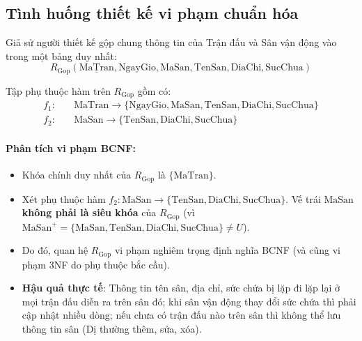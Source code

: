 \subsection{Tình huống thiết kế vi phạm chuẩn hóa}
Giả sử người thiết kế gộp chung thông tin của Trận đấu và Sân vận động vào trong một bảng duy nhất:
$$R_{\text{Gop}}(\underline{\text{MaTran}}, \text{NgayGio}, \text{MaSan}, \text{TenSan}, \text{DiaChi}, \text{SucChua})$$

Tập phụ thuộc hàm trên $R_{\text{Gop}}$ gồm có:
\begin{align*}
    f_1: & \quad \text{MaTran} \rightarrow \{\text{NgayGio}, \text{MaSan}, \text{TenSan}, \text{DiaChi}, \text{SucChua}\} \\
    f_2: & \quad \text{MaSan} \rightarrow \{\text{TenSan}, \text{DiaChi}, \text{SucChua}\}
\end{align*}

\paragraph{Phân tích vi phạm BCNF:}
\begin{itemize}
    \item Khóa chính duy nhất của $R_{\text{Gop}}$ là $\{\text{MaTran}\}$.
    \item Xét phụ thuộc hàm $f_2: \text{MaSan} \rightarrow \{\text{TenSan}, \text{DiaChi}, \text{SucChua}\}$. Vế trái $\text{MaSan}$ \textbf{không phải là siêu khóa} của $R_{\text{Gop}}$ (vì $\text{MaSan}^+ = \{\text{MaSan}, \text{TenSan}, \text{DiaChi}, \text{SucChua}\} \neq U$).
    \item Do đó, quan hệ $R_{\text{Gop}}$ vi phạm nghiêm trọng định nghĩa BCNF (và cũng vi phạm 3NF do phụ thuộc bắc cầu).
    \item \textbf{Hậu quả thực tế}: Thông tin tên sân, địa chỉ, sức chứa bị lặp đi lặp lại ở mọi trận đấu diễn ra trên sân đó; khi sân vận động thay đổi sức chứa thì phải cập nhật nhiều dòng; nếu chưa có trận đấu nào trên sân thì không thể lưu thông tin sân (Dị thường thêm, sửa, xóa).
\end{itemize}


